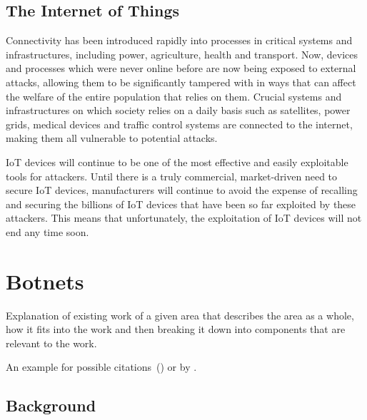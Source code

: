\subsection{The Internet of Things}

Connectivity has been introduced rapidly into processes in critical systems and infrastructures, including power, agriculture, health and transport. Now, devices and processes which were never online before are now being exposed to external attacks, allowing them to be significantly tampered with in ways that can affect the welfare of the entire population that relies on them. Crucial systems and infrastructures on which society relies on a daily basis such as satellites, power grids, medical
devices and traffic control systems are connected to the internet, making them all vulnerable to potential attacks.

IoT devices will continue to be one of the most effective and easily exploitable tools for attackers. Until there is a truly commercial, market-driven need to secure IoT devices, manufacturers will continue to avoid the expense of recalling and securing the billions of IoT devices that have been so far exploited by these attackers. This means that unfortunately, the exploitation of IoT devices will
not end any time soon.

\section{Botnets}

Explanation of existing work of a given area that describes the area as a whole, how it fits into the work and then breaking it down into components that are relevant to the work.

An example for possible citations~(\cite{Andrew2013empirical}) or by \cite{Asghari2015Economics}.

\subsection{Background}


